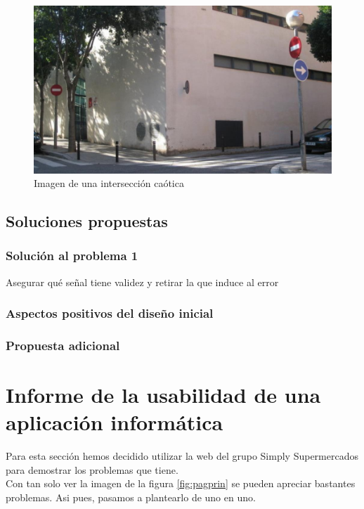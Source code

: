 \documentclass[a4paper,11pt]{article}
\begin{document}
\begin{figure}[h!]
 \centering
 \includegraphics[scale=0.35]{prohibidoseverywhere.png}
 \caption{Imagen de una intersección caótica}
 \label{fig:imgsenales}
\end{figure}


\subsection{Soluciones propuestas}
\subsubsection{Solución al problema 1}
Asegurar qué señal tiene validez y retirar la que induce al error

\subsubsection{Aspectos positivos del diseño inicial}
\subsubsection{Propuesta adicional}




\section{Informe de la usabilidad de una aplicación informática}
Para esta sección hemos decidido utilizar la web del grupo Simply Supermercados \cite{webSimply} para demostrar los problemas que tiene.\\
Con tan solo ver la imagen de la figura \ref{fig:pagprin} se pueden apreciar bastantes problemas. Asi pues, pasamos a plantearlo de uno en uno.
\end{document}
